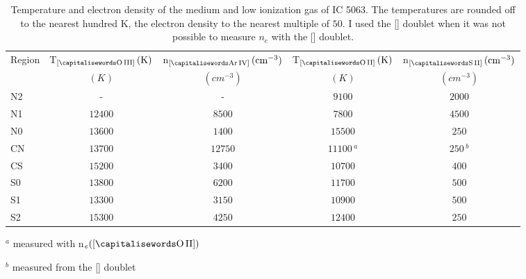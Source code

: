 \documentclass[../main.tex]{subfiles}
\begin{document}
\begin{table}
\caption[]{Temperature and electron density of the medium and low ionization gas of IC 5063. 
The temperatures are rounded off to the nearest hundred K, the electron density to the nearest multiple of $50$. 
I used the [] doublet when it was not possible to measure $n_e$ with the [] doublet. }
\label{tab:ted_ic}
\centering
\begin{threeparttable}
\begin{tabular}{lcccc}
\hline
Region&T$_{[\rm \ion{O}{III}]}\,(\si{K})$&n$_{[\rm \ion{Ar}{IV}]}\,(\si{cm^{-3}})$&T$_{[\rm \ion{O}{II}]}\,(\si{K})$&n$_{[\rm \ion{S}{II}]}\,(\si{cm^{-3}})$\\
&$(\si{K})$&$(\si{cm^{-3}})$&$(\si{K})$&$(\si{cm^{-3}})$\\
\hline
N2&-&-&$9100$&$2000$\\
N1&$12400$&$8500$&$7800$&$4500$\\
N0&$13600$&$1400$&$15500$&$250$\\
CN&$13700$&$12750$&$11100\,^a$&$250\,^b$\\
CS&$15200$&$3400$&$10700$&$400$\\
S0&$13800$&$6200$&$11700$&$500$\\
S1&$13300$&$3150$&$10900$&$500$\\
S2&$15300$&$4250$&$12400$&$250$\\
\hline
\end{tabular}
\begin{tablenotes}
\item $^a$ measured with n$_e([\rm \ion{O}{II}])$
\item $^b$ measured from the [] doublet
\end{tablenotes}
\end{threeparttable}
\end{table}
\end{document}

